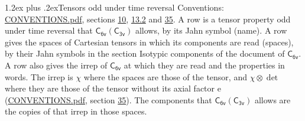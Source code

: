 \documentclass[10pt,a4paper]{article}
\makeatletter
\renewcommand\section{\@startsection{section}{1}{\z@}{-3ex plus -1ex minus -.2ex}%
  {1.2ex plus .2ex}{\normalfont\large\sffamily\bfseries\color{parttitle}}}
\numberwithin{equation}{section}
\newcommand{\grp}[1]{\mathsf{#1}}
\newcommand{\irrprod}{\otimes}
\makeatother
\begin{document}
\section{Tensors odd under time reversal}\label{s:time_odd}
Conventions: \href{../../CONVENTIONS.pdf}{CONVENTIONS.pdf}, sections \href{../../../rotation/CONVENTIONS.pdf\#conv.10}{10}, \href{../../../rotation/CONVENTIONS.pdf\#conv.13.2}{13.2} and \href{../../CONVENTIONS.pdf\#conv.35}{35}.
\leavevmode\label{n:head.name.property}A row is a tensor property odd under time reversal that $\grp{C_{6v}}(\grp{C_{3v}})$ allows, by its Jahn symbol (name). \label{n:head.spaces}A row gives the spaces of Cartesian tensors in which its components are read (spaces), by their Jahn symbols in the section Isotypic components of the document of \href{../../../rotation/data/pdf/C6v.pdf}{$\grp{C_{6v}}$}. \label{n:head.properties}A row also gives the irrep of $\grp{C_{6v}}$ at which they are read and the properties in words. The irrep is $\chi$ where the spaces are those of the tensor, and $\chi \irrprod \det$ where they are those of the tensor without its axial factor e (\href{../../CONVENTIONS.pdf}{CONVENTIONS.pdf}, section \href{../../CONVENTIONS.pdf\#conv.35}{35}). The components that $\grp{C_{6v}}(\grp{C_{3v}})$ allows are the copies of that irrep in those spaces.
\end{document}
